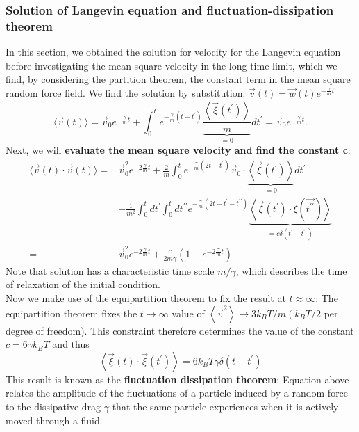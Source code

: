 \documentclass[12pt,a4paper]{article}
\begin{document}
\subsubsection{Solution of Langevin equation and fluctuation-dissipation theorem}
In this section, we obtained the solution for velocity for the Langevin equation before investigating the mean square velocity in the long time limit, which we find, by considering the partition theorem, the constant term in the mean square random force field. We find the solution by substitution: $\vec{v}(t)=\vec{w}(t) e^{-\frac{\gamma}{m} t}$
$$
\langle\vec{v}(t)\rangle=\vec{v}_0 e^{-\frac{\gamma}{m} t}+\int_0^t e^{-\frac{\gamma}{m}\left(t-t^{\prime}\right)} \underbrace{\frac{\left\langle\vec{\xi}\left(t^{\prime}\right)\right\rangle}{m}}_{=0} d t^{\prime}=\vec{v}_0 e^{-\frac{\gamma}{m} t} .
$$
Next, we will \textbf{evaluate the mean square velocity and find the constant c}:
\begin{align}
    \langle\vec{v}(t) \cdot \vec{v}(t)\rangle= & \vec{v}_0^2 e^{-2 \frac{\gamma}{m} t}+\frac{2}{m} \int_0^t e^{-\frac{\gamma}{m}\left(2 t-t^{\prime}\right)} \vec{v}_0 \cdot \underbrace{\left\langle\vec{\xi}\left(t^{\prime}\right)\right\rangle}_{=0} d t^{\prime} \\
    & +\frac{1}{m^2} \int_0^t d t^{\prime} \int_0^t d t^{\prime \prime} e^{-\frac{\gamma}{m}\left(2 t-t^{\prime}-t^{\prime \prime}\right)} \underbrace{\left\langle\vec{\xi}\left(t^{\prime}\right) \cdot \xi\left(\overrightarrow{t^{\prime \prime}}\right)\right\rangle}_{=c \delta\left(t^{\prime}-t^{\prime \prime}\right)} \\
    = & \vec{v}_0^2 e^{-2 \frac{\gamma}{m} t}+\frac{c}{2 m \gamma}\left(1-e^{-2 \frac{\gamma}{m} t}\right)
\end{align}
Note that solution has a characteristic time scale $m/\gamma$, which describes the time of relaxation of the initial condition.\\
Now we make use of the equipartition theorem to fix the result at $t\approx \infty$:
The equipartition theorem fixes the $t \rightarrow \infty$ value of $\left\langle\vec{v}^2\right\rangle \rightarrow 3 k_B T / m\left(k_B T / 2\right.$ per degree of freedom). This constraint therefore determines the value of the constant $c=6 \gamma k_B T$ and thus
$$
\left\langle\vec{\xi}(t) \cdot \vec{\xi}\left(t^{\prime}\right)\right\rangle=6 k_B T \gamma \delta\left(t-t^{\prime}\right)
$$
This result is known as the \textbf{fluctuation dissipation theorem}; Equation above relates the amplitude of the fluctuations of a particle induced by a random force to the dissipative drag $\gamma$ that the same particle experiences when it is actively moved through a fluid.
\end{document}
